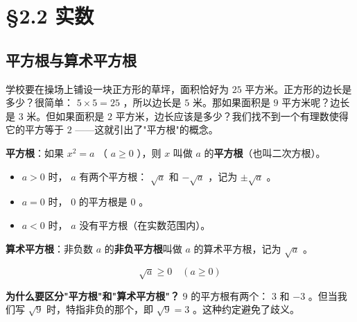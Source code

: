 \chapter{§2.2 实数}
\label{sec:2.2}





\section*{平方根与算术平方根}


\begin{explore}


学校要在操场上铺设一块正方形的草坪，面积恰好为 $25$ 平方米。正方形的边长是多少？很简单： $5 \times 5 = 25$ ，所以边长是 $5$ 米。那如果面积是 $9$ 平方米呢？边长是 $3$ 米。但如果面积是 $2$ 平方米，边长应该是多少？我们找不到一个有理数使得它的平方等于 $2$ ——这就引出了"平方根"的概念。

\end{explore}

\begin{understand}


\textbf{平方根}：如果 $x^2 = a$ （ $a \geq 0$ ），则 $x$ 叫做 $a$ 的\textbf{平方根}（也叫二次方根）。

\begin{itemize}
  \item $a > 0$ 时， $a$ 有两个平方根： $\sqrt{a}$ 和 $-\sqrt{a}$ ，记为 $\pm\sqrt{a}$ 。
  \item $a = 0$ 时， $0$ 的平方根是 $0$ 。
  \item $a < 0$ 时， $a$ 没有平方根（在实数范围内）。
\end{itemize}


\textbf{算术平方根}：非负数 $a$ 的\textbf{非负平方根}叫做 $a$ 的算术平方根，记为 $\sqrt{a}$ 。

\[
\sqrt{a} \geq 0 \quad (a \geq 0)
\]


\textbf{为什么要区分"平方根"和"算术平方根"？} $9$ 的平方根有两个： $3$ 和 $-3$ 。但当我们写 $\sqrt{9}$ 时，特指非负的那个，即 $\sqrt{9} = 3$ 。这种约定避免了歧义。

\end{understand}

